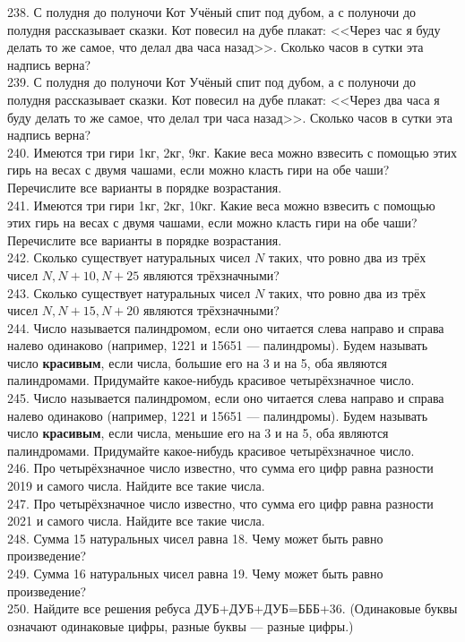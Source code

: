 238. С полудня до полуночи Кот Учёный спит под дубом, а с полуночи до полудня рассказывает сказки. Кот повесил на дубе плакат: <<Через час я буду делать то же самое, что делал два часа назад>>. Сколько часов в сутки эта надпись верна?\\
239. С полудня до полуночи Кот Учёный спит под дубом, а с полуночи до полудня рассказывает сказки. Кот повесил на дубе плакат: <<Через два часа я буду делать то же самое, что делал три часа назад>>. Сколько часов в сутки эта надпись верна?\\
240. Имеются три гири 1кг, 2кг, 9кг. Какие веса можно взвесить с помощью этих гирь на весах с двумя чашами, если можно класть гири на обе чаши? Перечислите все варианты в порядке возрастания.\\
241. Имеются три гири 1кг, 2кг, 10кг. Какие веса можно взвесить с помощью этих гирь на весах с двумя чашами, если можно класть гири на обе чаши? Перечислите все варианты в порядке возрастания.\\
242. Сколько существует натуральных чисел $N$ таких, что ровно два из трёх чисел $N, N+10, N+25$ являются трёхзначными?\\
243. Сколько существует натуральных чисел $N$ таких, что ровно два из трёх чисел $N, N+15, N+20$ являются трёхзначными?\\
244. Число называется палиндромом, если оно читается слева направо и справа налево одинаково (например, 1221 и 15651 --- палиндромы). Будем называть число {\bf красивым}, если числа, большие его на 3 и на 5, оба являются палиндромами. Придумайте какое-нибудь красивое четырёхзначное число.\\
245. Число называется палиндромом, если оно читается слева направо и справа налево одинаково (например, 1221 и 15651 --- палиндромы). Будем называть число {\bf красивым}, если числа, меньшие его на 3 и на 5, оба являются палиндромами. Придумайте какое-нибудь красивое четырёхзначное число.\\
246. Про четырёхзначное число известно, что сумма его цифр равна разности 2019 и самого числа. Найдите все такие числа.\\
247. Про четырёхзначное число известно, что сумма его цифр равна разности 2021 и самого числа. Найдите все такие числа.\\
248. Сумма 15 натуральных чисел равна 18. Чему может быть равно произведение?\\
249. Сумма 16 натуральных чисел равна 19. Чему может быть равно произведение?\\
250. Найдите все решения ребуса ДУБ+ДУБ+ДУБ=БББ+36. (Одинаковые буквы означают одинаковые цифры, разные буквы --- разные цифры.)\\
